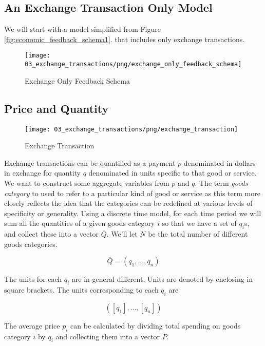 \subsection{An Exchange Transaction Only Model}

We will start with a model simplified from Figure \ref{fig:economic_feedback_schema1}. that includes only
exchange transactions.

\begin{figure}[H]
\centering
\texttt{[image: 03\_exchange\_transactions/png/exchange\_only\_feedback\_schema]}
\caption{Exchange Only Feedback Schema}
\label{fig:exchange_only_feedback_schema1}
\end{figure}

\subsection{Price and Quantity}

\begin{figure}[H]
\centering
\texttt{[image: 03\_exchange\_transactions/png/exchange\_transaction]}
\caption{Exchange Transaction}
\label{fig:exchange_transaction2}
\end{figure}

Exchange transactions can be quantified as a payment $p$ denominated in dollars in exchange for
quantity $q$ denominated in units specific to that good or service. We want to construct some
aggregate variables from $p$ and $q$. The term \textit{goods category} to used to refer to a
particular kind of good or service as this term more closely reflects the idea that the categories
can be redefined at various levels of specificity or generality. Using a discrete time model, for
each time period we will sum all the quantities of a given goods category $i$ so that we have a set
of $q_i$s, and collect these into a vector $\overline Q$. We'll let $N$ be the total number of
different goods categories.

\begin{equation} \label{eq:qbar}
    \overline Q = \left( q_1, \dots, q_n \right)
\end{equation}

The units for each $q_i$ are in general different. Units are denoted by enclosing in square
brackets. The units corresponding to each $q_i$ are

\[ \left( \left[ q_1 \right], \dots, \left[ q_n \right] \right) \]

The average price $p_i$ can be calculated by dividing total spending on goods category $i$ by $q_i$
and collecting them into a vector $\overline P$.


